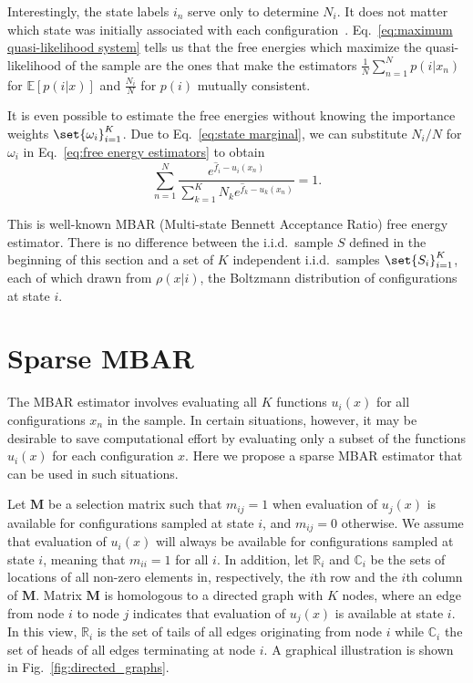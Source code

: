 \documentclass[layout=twocolumn]{achemso}
\DeclarePairedDelimiter\set\{\}
\newcommand{\mt}[1]{\boldsymbol{\mathbf{#1}}}   %
\begin{document}
Interestingly, the state labels $i_n$ serve only to determine $N_i$.
It does not matter which state was initially associated with each configuration~\cite{Kong_2003}.
Eq.~\eqref{eq:maximum quasi-likelihood system} tells us that the free energies which maximize the quasi-likelihood of the sample are the ones that make the estimators $\frac{1}{N} \sum_{n=1}^N p(i|x_n)$ for $\mathbb{E}\left[p(i|x)\right]$ and $\frac{N_i}{N}$ for $p(i)$ mutually consistent.

It is even possible to estimate the free energies without knowing the importance weights $\set{\omega_i}_{i=1}^K$.
Due to Eq.~\eqref{eq:state marginal}, we can substitute $N_i / N$ for $\omega_i$ in Eq.~\eqref{eq:free energy estimators} to obtain
\begin{equation}
    \label{eq:MBAR}
    \sum_{n=1}^N \frac{
        e^{\hat f_i - u_i(x_n)}
    }{
        \sum_{k=1}^K N_k e^{\hat f_k - u_k(x_n)}
    } = 1.
\end{equation}

This is well-known MBAR (Multi-state Bennett Acceptance Ratio) free energy estimator\cite{Shirts_2008}.
There is no difference between the i.i.d.~sample $S$ defined in the beginning of this section and a set of $K$ independent i.i.d.~samples $\set{S_i}_{i=1}^K$, each of which drawn from $\rho(x|i)$, the Boltzmann distribution of configurations at state $i$.

\section{Sparse MBAR}\label{sec:sparse mbar}

The MBAR estimator involves evaluating all $K$ functions $u_i(x)$ for all configurations $x_n$ in the sample.
In certain situations, however, it may be desirable to save computational effort by evaluating only a subset of the functions $u_i(x)$ for each configuration $x$.
Here we propose a sparse MBAR estimator that can be used in such situations.

Let $\mt M$ be a selection matrix such that $m_{ij} = 1$ when evaluation of $u_j(x)$ is available for configurations sampled at state $i$, and $m_{ij} = 0$ otherwise.
We assume that evaluation of $u_i(x)$ will always be available for configurations sampled at state $i$, meaning that $m_{ii} = 1$ for all $i$.
In addition, let $\mathbb{R}_i$ and $\mathbb{C}_i$ be the sets of locations of all non-zero elements in, respectively, the $i$th row and the $i$th column of $\mt M$.
Matrix $\mt M$ is homologous to a directed graph with $K$ nodes, where an edge from node $i$ to node $j$ indicates that evaluation of $u_j(x)$ is available at state $i$.
In this view, $\mathbb{R}_i$ is the set of tails of all edges originating from node $i$ while $\mathbb{C}_i$ the set of heads of all edges terminating at node $i$.
A graphical illustration is shown in Fig.~\ref{fig:directed_graphs}.
\end{document}
